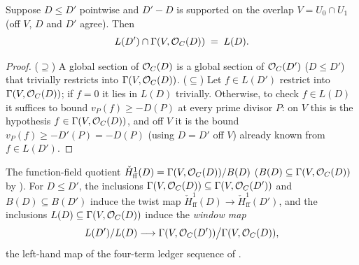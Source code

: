 \begin{theorem}
  \label{thm:adelic_linearSystem_inf_overlap_eq}
  \leanok
  Suppose \(D \le D'\) pointwise and \(D' - D\) is supported on the
  overlap \(V = U_0 \cap U_1\) (off \(V\), \(D\) and \(D'\) agree). Then
  \[
    L(D') \cap \Gamma(V, \mathcal{O}_{C}(D)) \;=\; L(D).
  \]
\end{theorem}
\begin{proof}
  \leanok
  (\(\supseteq\)) A global section of \(\mathcal{O}_{C}(D)\) is a global
  section of \(\mathcal{O}_{C}(D')\) (\(D \le D'\)) that trivially restricts
  into \(\Gamma(V, \mathcal{O}_{C}(D))\). (\(\subseteq\)) Let \(f \in L(D')\)
  restrict into \(\Gamma(V, \mathcal{O}_{C}(D))\); if \(f = 0\) it lies in
  \(L(D)\) trivially. Otherwise, to check \(f \in L(D)\) it suffices to
  bound \(v_P(f) \ge -D(P)\) at every prime divisor \(P\): on \(V\) this
  is the hypothesis \(f \in \Gamma(V, \mathcal{O}_{C}(D))\), and off \(V\) it
  is the bound \(v_P(f) \ge -D'(P) = -D(P)\) (using \(D = D'\) off
  \(V\)) already known from \(f \in L(D')\).
\end{proof}

\begin{definition}
  \label{def:adelic_H1_window}
  \leanok
  The function-field quotient \(\check{H}^1_{\mathrm{ff}}(D) = \Gamma(V,
  \mathcal{O}_{C}(D))/B(D)\) (\(B(D) \subseteq \Gamma(V, \mathcal{O}_{C}(D))\) by
  ). For \(D \le D'\), the
  inclusions \(\Gamma(V, \mathcal{O}_{C}(D)) \subseteq \Gamma(V,
  \mathcal{O}_{C}(D'))\) and \(B(D) \subseteq B(D')\) induce the twist map
  \(\check{H}^1_{\mathrm{ff}}(D) \to
  \check{H}^1_{\mathrm{ff}}(D')\), and the inclusions \(L(D)
  \subseteq \Gamma(V, \mathcal{O}_{C}(D))\) induce the \emph{window map}
  \[
    L(D')/L(D) \longrightarrow \Gamma(V, \mathcal{O}_{C}(D'))\big/
      \Gamma(V, \mathcal{O}_{C}(D)),
  \]
  the left-hand map of the four-term ledger sequence of
  .
\end{definition}


